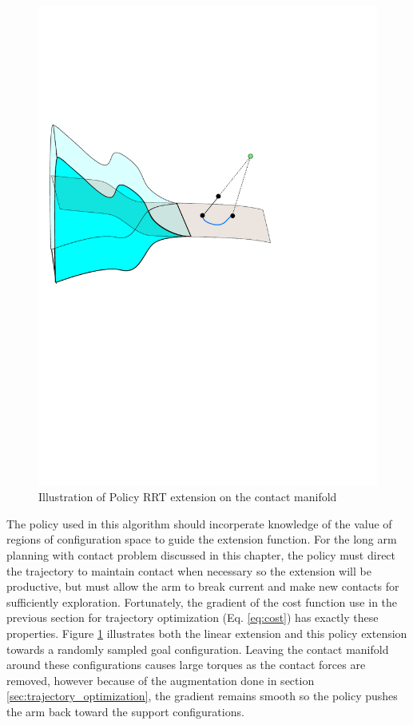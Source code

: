 \documentclass[../thesis.tex]{subfiles}
\begin{document}
\begin{figure}
  \centering
  \includegraphics[width=.5\linewidth]{./Planning/extend.pdf}
  
  \caption{Illustration of Policy RRT extension on the contact manifold}
  \label{fig:extend}
\end{figure}





The policy used in this algorithm should incorperate knowledge of the value of regions of configuration space to guide the extension function.
For the long arm planning with contact problem discussed in this chapter, the policy must direct the trajectory to maintain contact when necessary so the extension will be productive, but must allow the arm to break current and make new contacts for sufficiently exploration.
Fortunately, the gradient of the cost function use in the previous section for trajectory optimization (Eq. \ref{eq:cost}) has exactly these properties.
Figure \ref{fig:extend} illustrates both the linear extension and this policy extension towards a randomly sampled goal configuration.
Leaving the contact manifold around these configurations causes large torques as the contact forces are removed, however because of the augmentation done in section \ref{sec:trajectory_optimization}, the gradient remains smooth so the policy pushes the arm back toward the support configurations.
\end{document}
